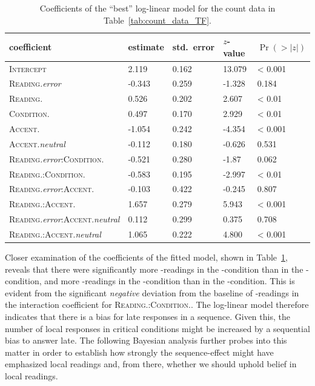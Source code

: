 \documentclass[fleqn,reqno,10pt]{article}
\newcommand{\lc}{\acro{lc}}
\newcommand{\ec}{\acro{ec}}
\begin{document}
\begin{table}
  \centering
  \begin{tabular}{lllll}
    coefficient & estimate & std.~error & $z$-value & $\Pr(>|z|)$ \\
    \midrule
    \textsc{Intercept} & 2.119  &   0.162 & 13.079   & < 0.001 \\
    \textsc{Reading}.\emph{error} & -0.343 &  0.259 & -1.328 &  0.184
    \\
    \textsc{Reading}.\lc & 0.526 &  0.202 & 2.607 & < 0.01 \\
    \textsc{Condition}.\lc & 0.497 &  0.170  & 2.929 & < 0.01 \\
    \textsc{Accent}.\lc & -1.054 & 0.242 & -4.354 & < 0.001 \\
    \textsc{Accent}.\emph{neutral} & -0.112 & 0.180 &  -0.626 &  0.531
    \\
    \textsc{Reading}.\emph{error}:\textsc{Condition}.\lc & -0.521 &
    0.280 & -1.87 & 0.062 \\
    \textsc{Reading}.\lc:\textsc{Condition}.\lc & -0.583 & 0.195 &
    -2.997 &  < 0.01 \\
    \textsc{Reading}.\emph{error}:\textsc{Accent}.\lc & -0.103 &
    0.422 &  -0.245 & 0.807  \\
    \textsc{Reading}.\lc:\textsc{Accent}.\lc & 1.657 &  0.279 & 5.943
    & < 0.001 \\
    \textsc{Reading}.\emph{error}:\textsc{Accent}.\emph{neutral} & 0.112 &
    0.299  &  0.375 &  0.708 \\
    \textsc{Reading}.\lc:\textsc{Accent}.\emph{neutral} & 1.065  &
    0.222 &  4.800 & < 0.001 \\
  \end{tabular}
  \caption{Coefficients of the ``best'' log-linear model for the count
    data in Table~\ref{tab:count_data_TF}.}
  \label{tab:Coefficients-TF}
\end{table}

Closer examination of the coefficients of the fitted model, shown in
Table~\ref{tab:Coefficients-TF}, reveals that there were significantly
more \ec-readings in the \lc-condition than in the \ec-condition, and
more \lc-readings in the \ec-condition than in the \lc-condition. This
is evident from the significant \emph{negative} deviation from the
baseline of \ec-readings in the interaction coefficient for
\textsc{Reading}.\lc:\textsc{Condition}.\lc. The log-linear model
therefore indicates that there is a bias for late responses in a
sequence. Given this, the number of local responses in critical
conditions might be increased by a sequential bias to answer late. The
following Bayesian analysis further probes into this matter in order
to establish how strongly the sequence-effect might have emphasized
local readings and, from there, whether we should uphold belief in
local readings.
\end{document}
